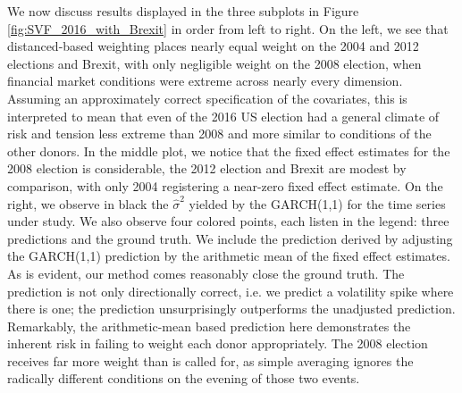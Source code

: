 \documentclass[11pt,3p,review,authoryear]{elsarticle}
\theoremstyle{definition}
\begin{document}
We now discuss results displayed in the three subplots in Figure \ref{fig:SVF_2016_with_Brexit} in order from left to right. On the left, we see that distanced-based weighting places nearly equal weight on the 2004 and 2012 elections and Brexit, with only negligible weight on the 2008 election, when financial market conditions were extreme across nearly every dimension. Assuming an approximately correct specification of the covariates, this is interpreted to mean that even of the 2016 US election had a general climate of risk and tension less extreme than 2008 and more similar to conditions of the other donors.  In the middle plot, we notice that the fixed effect estimates for the 2008 election is considerable, the 2012 election and Brexit are modest by comparison, with only 2004 registering a near-zero fixed effect estimate. On the right, we observe in black the  $\hat\sigma^{2}$ yielded by the GARCH(1,1) for the time series under study.  We also observe four colored points, each listen in the legend: three predictions and the ground truth.  We include the prediction derived by adjusting the GARCH(1,1) prediction by the arithmetic mean of the fixed effect estimates.  As is evident, our method comes reasonably close the ground truth.  The prediction is not only directionally correct, i.e. we predict a volatility spike where there is one; the prediction unsurprisingly outperforms the unadjusted prediction.  Remarkably, the arithmetic-mean based prediction here demonstrates the inherent risk in failing to weight each donor appropriately.  The 2008 election receives far more weight than is called for, as simple averaging ignores the radically different conditions on the evening of those two events.  %
\end{document}
